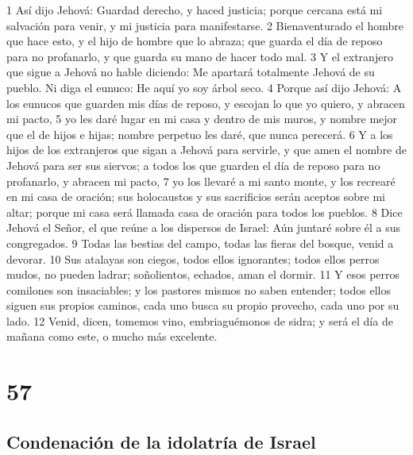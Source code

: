 1 Así dijo Jehová: Guardad derecho, y haced justicia; porque cercana está mi salvación para venir, y mi justicia para manifestarse.
2 Bienaventurado el hombre que hace esto, y el hijo de hombre que lo abraza; que guarda el día de reposo para no profanarlo, y que guarda su mano de hacer todo mal.
3 Y el extranjero que sigue a Jehová no hable diciendo: Me apartará totalmente Jehová de su pueblo. Ni diga el eunuco: He aquí yo soy árbol seco.
4 Porque así dijo Jehová: A los eunucos que guarden mis días de reposo, y escojan lo que yo quiero, y abracen mi pacto,
5 yo les daré lugar en mi casa y dentro de mis muros, y nombre mejor que el de hijos e hijas; nombre perpetuo les daré, que nunca perecerá.
6 Y a los hijos de los extranjeros que sigan a Jehová para servirle, y que amen el nombre de Jehová para ser sus siervos; a todos los que guarden el día de reposo para no profanarlo, y abracen mi pacto,
7 yo los llevaré a mi santo monte, y los recrearé en mi casa de oración; sus holocaustos y sus sacrificios serán aceptos sobre mi altar; porque mi casa será llamada casa de oración para todos los pueblos. 
8 Dice Jehová el Señor, el que reúne a los dispersos de Israel: Aún juntaré sobre él a sus congregados.
9 Todas las bestias del campo, todas las fieras del bosque, venid a devorar.
10 Sus atalayas son ciegos, todos ellos ignorantes; todos ellos perros mudos, no pueden ladrar; soñolientos, echados, aman el dormir.
11 Y esos perros comilones son insaciables; y los pastores mismos no saben entender; todos ellos siguen sus propios caminos, cada uno busca su propio provecho, cada uno por su lado.
12 Venid, dicen, tomemos vino, embriaguémonos de sidra; y será el día de mañana como este, o mucho más excelente.

\chapter{57}

\section*{Condenación de la idolatría de Israel}

